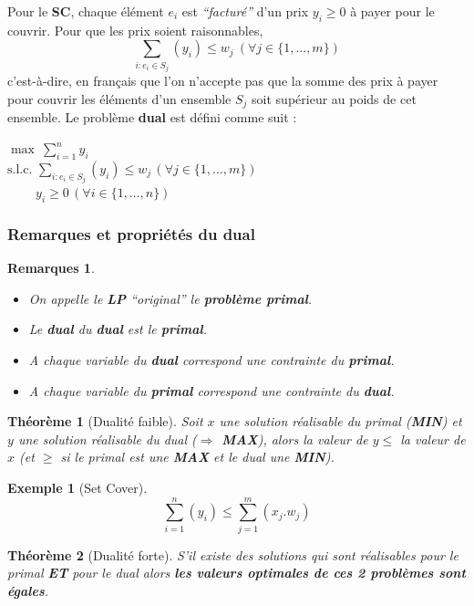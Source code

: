 \documentclass{article}
\newcommand{\titre}[1]{\textcolor{title}{#1}}
\newtheorem{exemple}{Exemple}[section]
\newtheorem{rems}{Remarques}[section]
\newtheorem{thm}{Th\'eor\`eme}[section]
\begin{document}
\begin{sffamily}
Pour le \textbf{\titre{SC}}, chaque élément $e_i$ est \textit{``facturé''} d'un prix $y_i \geq 0$ à payer pour le couvrir. Pour que les 
prix soient raisonnables,
$$\sum_{i:e_i\in S_j} (y_i) \leq w_j\ (\forall j \in \{1,...,m\})$$
c'est-à-dire, en français que l'on n'accepte pas que la somme des prix à payer pour couvrir les éléments d'un ensemble $S_j$ soit 
supérieur au poids de cet ensemble. Le problème \textbf{dual} est défini comme suit :

$\max\ \sum_{i=1}^n y_i$ \\
\indent $\text{s.l.c. } \sum_{i:e_i \in S_j}(y_i) \leq w_j\, (\forall j \in \{1,\ldots ,m\})$ \\
\indent $\qquad\ y_i \geq 0\, (\forall i \in \{1,\ldots ,n\})$

\subsubsection{Remarques et propriétés du dual}

\begin{rems}
\begin{itemize}
\item On appelle le \textbf{\titre{LP}} ``original'' le \textbf{problème primal}.
\item Le \textbf{dual} du \textbf{dual} est le \textbf{primal}.
\item A chaque variable du \textbf{dual} correspond une contrainte du \textbf{primal}.
\item A chaque variable du \textbf{primal} correspond une contrainte du \textbf{dual}.
\end{itemize}
\end{rems}

\begin{thm}[\titre{Dualité faible}] Soit $x$ une solution réalisable du primal (\textbf{MIN}) et $y$ une solution réalisable du dual	 
(\textbf{$\Rightarrow$ MAX}), alors la valeur de $y \leq$ la valeur de $x$ (et $\geq$ si le primal est une \textbf{MAX} et le dual 
une \textbf{MIN}).
\end{thm}

\begin{exemple}[Set Cover]
$$\sum_{i=1}^n(y_i) \leq \sum^m_{j=1} (x_j.w_j)$$
\end{exemple}

\begin{thm}[\titre{Dualité forte}] S'il existe des solutions qui sont réalisables pour le primal \textbf{ET} pour le dual alors 
\textbf{les valeurs optimales de ces 2 problèmes sont égales}.
\end{thm}


\end{sffamily}
\end{document}
